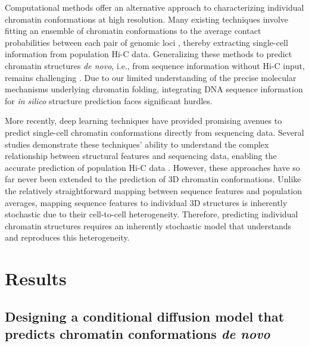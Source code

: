 \documentclass[12pt,letterpaper]{article}
\begin{document}
Computational methods offer an alternative approach to characterizing individual chromatin conformations at high resolution. Many existing techniques involve fitting an ensemble of chromatin conformations to the average contact probabilities between each pair of genomic loci \cite{Zhang2015a, Fiorillo2021,Shi2021,Boninsegna2022,Sun2021,Kadam2023}, thereby extracting single-cell information from population Hi-C data. Generalizing these methods to predict chromatin structures \emph{de novo}, i.e., from sequence information without Hi-C input, remains challenging \cite{Qi2019, DiPierro2017, MacPherson2018,forte2023Transcription}. Due to our limited understanding of the precise molecular mechanisms underlying chromatin folding, integrating DNA sequence information for \emph{in silico} structure prediction faces significant hurdles.



More recently, deep learning techniques have provided promising avenues to predict single-cell chromatin conformations directly from sequencing data. Several studies demonstrate these techniques' ability to understand the complex relationship between structural features and sequencing data, enabling the accurate prediction of population Hi-C data \cite{fudenberg2020Predicting,Schwessinger2020,Zhou2022,Tan2023,Zhang2023a}. %
However, these approaches have so far never been extended to the prediction of 3D chromatin conformations. 
Unlike the relatively straightforward mapping between sequence features and population averages, mapping sequence features to individual 3D structures is inherently stochastic due to their cell-to-cell heterogeneity. 
Therefore, predicting individual chromatin structures requires an inherently stochastic model that %
understands and reproduces this heterogeneity. 


\section*{Results}


\subsection*{Designing a conditional diffusion model that predicts chromatin conformations \emph{de novo} }
\end{document}
